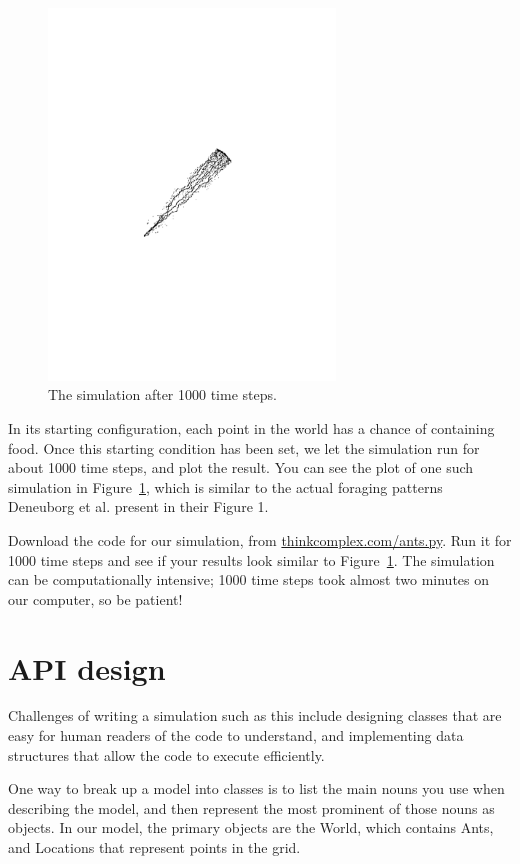 \documentclass[10pt]{book}
\begin{document}
\begin{figure}[ht]
\centerline{\includegraphics[width=3.0in]{figs/plot.pdf}}
\caption{The simulation after 1000 time steps.\label{fig.plot}}
\end{figure}

In its starting configuration, each point in the world has a chance of
containing food. Once this starting condition has been set, we let the
simulation run for about 1000 time steps, and plot the result. You can
see the plot of one such simulation in Figure~\ref{fig.plot}, which is
similar to the actual foraging patterns
Deneuborg et al. present in their Figure 1.


\begin{exercise}

Download the code for our simulation, from
\url{thinkcomplex.com/ants.py}.  Run it for 1000 time steps and see if
your results look similar to Figure~\ref{fig.plot}. The simulation can
be computationally intensive; 1000 time steps took almost two
minutes on our computer, so be patient!
\end{exercise}


\section{API design}

Challenges of writing a simulation such as this include designing
classes that are easy for human readers of the code to
understand, and implementing data structures that allow the
code to execute efficiently.

One way to break up a model into classes is to list the main nouns you
use when describing the model, and then represent the most prominent
of those nouns as objects. In our model, the primary objects are the
World, which contains Ants, and Locations that represent points in
the grid.
\end{document}
